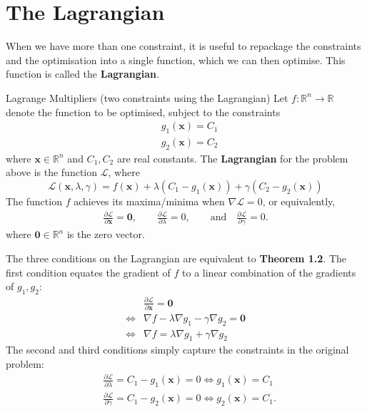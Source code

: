 \documentclass[11pt]{article}
\newcommand{\R}{\mathbb{R}}
\newcommand{\vx}{\bm{x}}
\begin{document}
	\section{The Lagrangian}
	When we have more than one constraint, it is useful to repackage the constraints and the optimisation into a single function, which we can then optimise. This function is called the \textbf{Lagrangian}. \\
	\begin{theorem}{Lagrange Multipliers (two constraints using the Lagrangian)}{}
			Let \( f:\R^n \to\R \) denote the function to be optimised, subject to the constraints 
		\begin{align*}
		& g_{1}(\vx) = C_1 \\
		& g_{2}(\vx) = C_2 
		\end{align*}
		where \( \vx\in\R^n \) and \( C_1, C_2 \) are real constants. The \textbf{Lagrangian} for the problem above is the function \( \mathcal{L} \), where
		\[	\mathcal{L}(\vx, \lambda, \gamma) = f(\vx) + \lambda (C_{1} - g_{1}(\vx)) + \gamma( C_{2} - g_{2}(\vx))
		\]
		The function \( f \) achieves its maxima/minima when \(\nabla \mathcal{L} = 0 \), or equivalently,
		\begin{align*}
			 \frac{\partial \mathcal{L}}{\partial \bm{x}} = \bm{0}, \qquad
			 \frac{\partial \mathcal{L}}{\partial \lambda} = 0 ,\qquad \text{and}\quad
			 \frac{\partial \mathcal{L}}{\partial \gamma} = 0.
		\end{align*}
		where \( \bm{0}\in\R^n \) is the zero vector.
	\end{theorem}
 	\noindent The three conditions on the Lagrangian are equivalent to \textbf{Theorem 1.2}. The first condition equates the gradient of \( f \) to a linear combination of the gradients of \( g_1,g_2 \):
 	\begin{align*}
 		     & \frac{\partial \mathcal{L}}{\partial \bm{x}} = \bm{0} \\
 		\iff & 	\nabla f -\lambda \nabla g_1 - \gamma \nabla g_2 = \bm{0} \\
 		\iff & \nabla f = \lambda \nabla g_1 + \gamma \nabla g_2
 		\end{align*}
	The second and third conditions simply capture the constraints in the original problem:
	\begin{align*}
		&\frac{\partial \mathcal{L}}{\partial \lambda} = C_1 - g_1(\vx) = 0\iff g_1(\vx) = C_1 \\
		&\frac{\partial \mathcal{L}}{\partial \gamma} = C_1 - g_2(\vx) = 0\iff g_2(\vx) = C_1.
	\end{align*}
\end{document}
